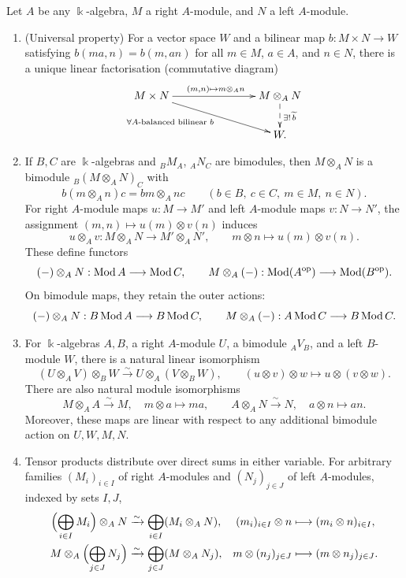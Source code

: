 \begin{lemma}\label{lem:tensor-properties}
Let $A$ be any $\Bbbk$-algebra, $M$ a right $A$-module, and $N$ a left $A$-module.
\begin{enumerate}
\item (Universal property) For a vector space $W$ and a bilinear map $b:M\times N\to W$ satisfying $b(ma,n)=b(m,an)$ for all $m\in M$, $a\in A$, and $n\in N$, there is a unique linear factorisation (commutative diagram)
\[
\xymatrix@C=75pt@R=22pt{
M\times N \ar[r]^{(m,n)\mapsto m\otimes_A n} \ar[dr]_{\forall A\text{-balanced bilinear }b\phantom{aaaaaaaaaa}}
& M\otimes_A N \ar@{-->}[d]^{\exists!\,\widetilde b}\\
& W.
}
\]

\item If $B,C$ are $\Bbbk$-algebras and ${}_BM_A$, ${}_AN_C$ are bimodules, then $M\otimes_A N$ is a bimodule ${}_B(M\otimes_A N)_C$ with
\[
b(m\otimes_A n)c=bm\otimes_A nc
\qquad(b\in B,\ c\in C,\ m\in M,\ n\in N).
\]
For right $A$-module maps $u:M\to M'$ and left $A$-module maps $v:N\to N'$, the assignment $(m,n)\mapsto u(m)\otimes v(n)$ induces
\[
u\otimes_A v:M\otimes_A N\longrightarrow M'\otimes_A N',
\qquad m\otimes n\longmapsto u(m)\otimes v(n).
\]
These define functors
\[
(-)\otimes_A N:\operatorname{\mathrm{Mod}} A\longrightarrow\operatorname{\mathrm{Mod}} C,\qquad
M\otimes_A(-):\operatorname{\mathrm{Mod}}(A^{\mathrm{op}})\longrightarrow\operatorname{\mathrm{Mod}}(B^{\mathrm{op}}).
\]
On bimodule maps, they retain the outer actions:
\[
(-)\otimes_A N: B\operatorname{\mathrm{Mod}} A \longrightarrow B\operatorname{\mathrm{Mod}} C,\qquad
M\otimes_A(-):A\operatorname{\mathrm{Mod}} C\longrightarrow B\operatorname{\mathrm{Mod}} C.
\]
\item For $\Bbbk$-algebras $A,B$, a right $A$-module $U$, a bimodule ${}_AV_B$, and a left $B$-module $W$, there is a natural linear isomorphism
\[
(U\otimes_A V)\otimes_B W\xrightarrow{\sim}U\otimes_A(V\otimes_B W),
\qquad (u\otimes v)\otimes w\longmapsto u\otimes(v\otimes w).
\]
There are also natural module isomorphisms
\[
M\otimes_A A\xrightarrow{\sim}M,\quad m\otimes a\longmapsto ma,
\qquad
A\otimes_A N\xrightarrow{\sim}N,\quad a\otimes n\longmapsto an.
\]
Moreover, these maps are linear with respect to any additional bimodule action on $U, W, M, N$.

\item Tensor products distribute over direct sums in either variable. For arbitrary families $(M_i)_{i\in I}$ of right $A$-modules and $(N_j)_{j\in J}$ of left $A$-modules, indexed by sets $I,J$,
\[
\begin{aligned}
\Bigl(\bigoplus_{i\in I}M_i\Bigr)\otimes_A N
&\xrightarrow{\sim}\bigoplus_{i\in I}(M_i\otimes_A N),
& (m_i)_{i\in I}\otimes n&\longmapsto(m_i\otimes n)_{i\in I},\\
M\otimes_A\Bigl(\bigoplus_{j\in J}N_j\Bigr)
&\xrightarrow{\sim}\bigoplus_{j\in J}(M\otimes_A N_j),
& m\otimes(n_j)_{j\in J}&\longmapsto(m\otimes n_j)_{j\in J}.
\end{aligned}
\]
\end{enumerate}
\end{lemma}

